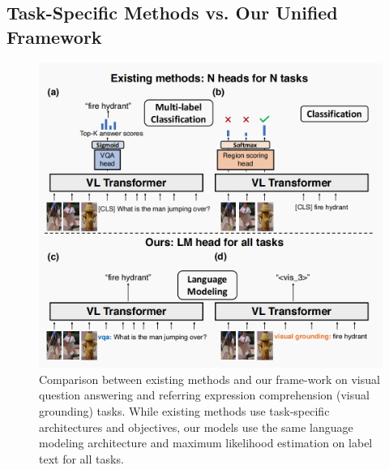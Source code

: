 \documentclass[twocolumn,3p,a4paper,preprint,11pt,margin=2.5cm]{elsarticle}
\begin{document}
\subsection{Task-Specific Methods vs. Our Unified Framework}
\begin{figure}[H]
    \centering
    \includegraphics[width=1\columnwidth]{image/image4.png}
    \caption{Comparison between existing methods and our frame-work on visual question answering and referring expression comprehension (visual grounding) tasks. While existing methods use
task-specific architectures and objectives, our models use the same
language modeling architecture and maximum likelihood estimation on label text for all tasks.}
    \label{fig:comparison}
\end{figure}
\end{document}
